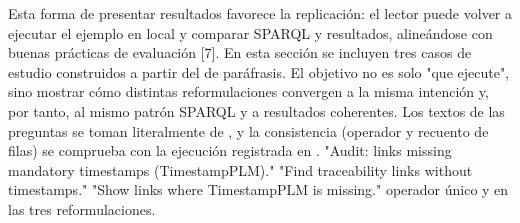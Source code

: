 {}Esta forma de presentar resultados favorece la replicación: el lector puede volver a ejecutar el ejemplo en local y comparar SPARQL y resultados, alineándose con buenas prácticas de evaluación [7].\markdownRendererInterblockSeparator
{}\markdownRendererInterblockSeparator
{}En esta sección se incluyen tres casos de estudio construidos a partir del  de paráfrasis. El objetivo no es solo "que ejecute", sino mostrar cómo distintas reformulaciones convergen a la misma intención y, por tanto, al mismo patrón SPARQL y a resultados coherentes.\markdownRendererInterblockSeparator
{}Los textos de las preguntas se toman literalmente de , y la consistencia (operador y recuento de filas) se comprueba con la ejecución registrada en .\markdownRendererInterblockSeparator
{}\markdownRendererInterblockSeparator
{}\markdownRendererUlBeginTight
\markdownRendererUlItem {} \markdownRendererUlItemEnd 
\markdownRendererUlItem {}\markdownRendererInterblockSeparator
{}\markdownRendererUlBeginTight
\markdownRendererUlItem "Audit: links missing mandatory timestamps (TimestampPLM)."\markdownRendererUlItemEnd 
\markdownRendererUlItem "Find traceability links without timestamps."\markdownRendererUlItemEnd 
\markdownRendererUlItem "Show links where TimestampPLM is missing."\markdownRendererUlItemEnd 
\markdownRendererUlEndTight \markdownRendererUlItemEnd 
\markdownRendererUlItem {} operador único  y  en las tres reformulaciones.\markdownRendererUlItemEnd 

